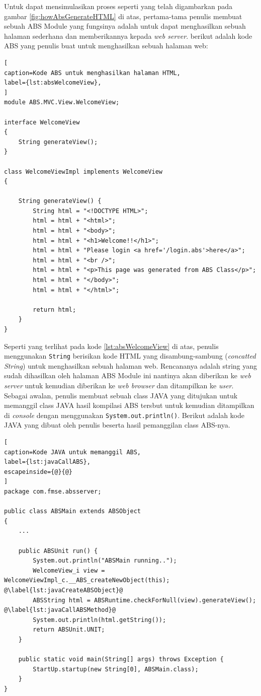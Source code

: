 Untuk dapat mensimulasikan proses seperti yang telah digambarkan pada gambar \ref{fig:howAbsGenerateHTML} di atas, pertama-tama penulis membuat sebuah ABS Module yang fungsinya adalah untuk dapat menghasilkan sebuah halaman sederhana dan memberikannya kepada \textit{web server}. berikut adalah kode ABS yang penulis buat untuk menghasilkan sebuah halaman web:

\begin{lstlisting}[
caption=Kode ABS untuk menghasilkan halaman HTML,
label={lst:absWelcomeView},
]
module ABS.MVC.View.WelcomeView;

interface WelcomeView
{
	String generateView();
}

class WelcomeViewImpl implements WelcomeView
{
	
	String generateView() {		
		String html = "<!DOCTYPE HTML>";
		html = html + "<html>";
		html = html + "<body>";
		html = html + "<h1>Welcome!!</h1>";
		html = html + "Please login <a href='/login.abs'>here</a>";
		html = html + "<br />";
		html = html + "<p>This page was generated from ABS Class</p>";
		html = html + "</body>";
		html = html + "</html>";
		
		return html;
	}
}
\end{lstlisting}

Seperti yang terlihat pada kode \ref{lst:absWelcomeView} di atas, penulis menggunakan \texttt{String} berisikan kode HTML yang disambung-sambung (\textit{concatted String}) untuk menghasilkan sebuah halaman web. Rencananya adalah string yang sudah dihasilkan oleh halaman ABS Module ini nantinya akan diberikan ke \textit{web server} untuk kemudian diberikan ke \textit{web browser} dan ditampilkan ke \textit{user}. Sebagai awalan, penulis membuat sebuah class JAVA yang ditujukan untuk memanggil class JAVA hasil kompilasi ABS tersbut untuk kemudian ditampilkan di \textit{console} dengan menggunakan \texttt{System.out.println()}. Berikut adalah kode JAVA yang dibuat oleh penulis beserta hasil pemanggilan class ABS-nya.

\begin{lstlisting}[
caption=Kode JAVA untuk memanggil ABS,
label={lst:javaCallABS},
escapeinside={@}{@}
]
package com.fmse.absserver;

public class ABSMain extends ABSObject 
{
    ...
       
    public ABSUnit run() {
        System.out.println("ABSMain running..");
        WelcomeView_i view = WelcomeViewImpl_c.__ABS_createNewObject(this); @\label{lst:javaCreateABSObject}@
        ABSString html = ABSRuntime.checkForNull(view).generateView(); @\label{lst:javaCallABSMethod}@
        System.out.println(html.getString());
        return ABSUnit.UNIT; 
    }
    
    public static void main(String[] args) throws Exception {
        StartUp.startup(new String[0], ABSMain.class);
    }
}
\end{lstlisting}

